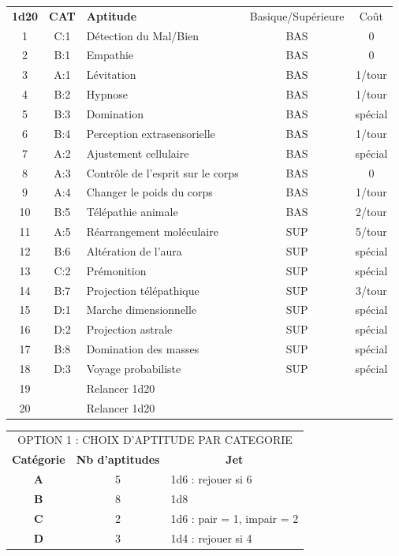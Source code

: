 \documentclass[11pt]{article}
\begin{document}
{\bigskip

\begin{tabular}{cclcc}
\textbf{1d20} & \textbf{CAT} & \textbf{Aptitude}& Basique/Supérieure & Coût \\
1   & C:1 & Détection du Mal/Bien       & BAS & 0 \\
2   & B:1 & Empathie                    & BAS & 0 \\
3   & A:1 & Lévitation                  & BAS & 1/tour \\
4   & B:2 & Hypnose                     & BAS & 1/tour \\
5   & B:3 & Domination                  & BAS & spécial \\
6   & B:4 & Perception extrasensorielle & BAS & 1/tour \\
7   & A:2 & Ajustement cellulaire       & BAS & spécial \\
8   & A:3 & Contrôle de l'esprit sur le corps & BAS & 0 \\
9   & A:4 & Changer le poids du corps   & BAS & 1/tour \\
10  & B:5 & Télépathie animale          & BAS & 2/tour \\
11  & A:5 & Réarrangement moléculaire   & SUP & 5/tour  \\
12  & B:6 & Altération de l'aura        & SUP & spécial  \\
13  & C:2 & Prémonition                 & SUP & spécial  \\
14  & B:7 & Projection télépathique     & SUP & 3/tour  \\
15  & D:1 & Marche dimensionnelle       & SUP & spécial  \\
16  & D:2 & Projection astrale          & SUP & spécial  \\
17  & B:8 & Domination des masses       & SUP & spécial  \\
18  & D:3 & Voyage probabiliste         & SUP & spécial  \\
19  &     & Relancer 1d20               & & \\
20  &     & Relancer 1d20               & & \\
\end{tabular}

\bigskip

\begin{tabular}{ccl}
\multicolumn{3}{c}{OPTION 1 : CHOIX D'APTITUDE PAR CATEGORIE} \\
\textbf{Catégorie} &  \textbf{Nb d'aptitudes} & \multicolumn{1}{c}{\textbf{Jet}} \\
\textbf{A} & 5 & 1d6 : rejouer si 6 \\
\textbf{B} & 8 & 1d8 \\
\textbf{C} & 2 & 1d6 : pair = 1, impair = 2 \\
\textbf{D} & 3 & 1d4 : rejouer si 4 \\
\end{tabular}

}
\end{document}
